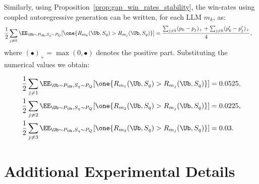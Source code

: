 Similarly, using Proposition~\ref{prop:gap_win_rates_stability}, the win-rates using coupled autoregressive generation can be written, for each LLM $m_k$, as:
\begin{equation}
    \begin{split}
       \frac{1}{2}\sum_{j\neq k}\EE_{\Ub \sim P_{\Ub}, S_q\sim P_Q}[\one\{R_{m_k}(\Ub, S_q)>R_{m_j}(\Ub, S_q)\}] & =\frac{\sum_{j\neq k}(p_k-p_j)_{+} + \sum_{j\neq k}(p'_k-p'_j)_{+}}{4},
    \end{split}
\end{equation}
where $(\bullet)_{+}=\max(0, \bullet)$ denotes the positive part. Substituting the numerical values we obtain:

 \begin{align*}
       \frac{1}{2}\sum_{j\neq 1}\EE_{\Ub \sim P_{\Ub}, S_q\sim P_Q}[\one\{R_{m_1}(\Ub, S_q)>R_{m_j}(\Ub, S_q)\}] & = 
       0.0525, \\
       \frac{1}{2}\sum_{j\neq 2}\EE_{\Ub \sim P_{\Ub}, S_q\sim P_Q}[\one\{R_{m_2}(\Ub, S_q)>R_{m_j}(\Ub, S_q)\}] &=
       0.0225, \\
       \frac{1}{2}\sum_{j\neq 3}\EE_{\Ub \sim P_{\Ub}, S_q\sim P_Q}[\one\{R_{m_3}(\Ub, S_q)>R_{m_j}(\Ub, S_q)\}] &=
       0.03.
\end{align*}






\newpage

\section{Additional Experimental Details} \label{app:add_exp}


\clearpage
\newpage


